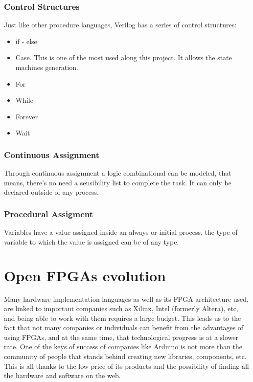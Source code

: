 \subsubsection{Control Structures}

Just like other procedure languages, Verilog has a series of control structures:

\begin{itemize}
	\item if - else
	\item Case. This is one of the most used along this project. It allows the state machines generation.
	\item For
	\item While
	\item Forever
	\item Wait
	
\end{itemize}

\subsubsection{Continuous Assignment}

Through continuous assignment a logic combinational can be modeled, that means, there’s no need a sensibility list to complete the task. It can only be declared outside of any process.

\subsubsection{Procedural Assigment}

Variables have a value assigned inside an always or initial process, the type of variable to which the value is assigned can be of any type.
\newpage
\section{Open FPGAs evolution}
Many hardware implementation languages as well as its FPGA architecture used, are linked to important companies such as Xilinx, Intel (formerly Altera), etc, and being able to work with them requires a large budget. \newline
This leads us to the fact that not many companies or individuals can benefit from the advantages of using FPGAs, and at the same time, that technological progress is at a slower rate. One of the keys of success of companies like Arduino is not more than the community of people that stands behind creating new libraries, components, etc. This is all thanks to the low price of its products and the possibility of finding all the hardware and software on the web. \newline

